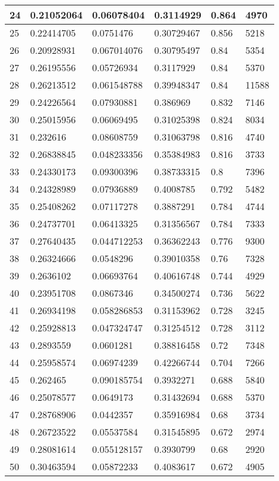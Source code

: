 \begin{longtable}{|l|l|l|l|l|l|}
24 & 0.21052064 & 0.06078404 & 0.3114929 & 0.864 & 4970 \\ \hline 
25 & 0.22414705 & 0.0751476 & 0.30729467 & 0.856 & 5218 \\ \hline 
26 & 0.20928931 & 0.067014076 & 0.30795497 & 0.84 & 5354 \\ \hline 
27 & 0.26195556 & 0.05726934 & 0.3117929 & 0.84 & 5370 \\ \hline 
28 & 0.26213512 & 0.061548788 & 0.39948347 & 0.84 & 11588 \\ \hline 
29 & 0.24226564 & 0.07930881 & 0.386969 & 0.832 & 7146 \\ \hline 
30 & 0.25015956 & 0.06069495 & 0.31025398 & 0.824 & 8034 \\ \hline 
31 & 0.232616 & 0.08608759 & 0.31063798 & 0.816 & 4740 \\ \hline 
32 & 0.26838845 & 0.048233356 & 0.35384983 & 0.816 & 3733 \\ \hline 
33 & 0.24330173 & 0.09300396 & 0.38733315 & 0.8 & 7396 \\ \hline 
34 & 0.24328989 & 0.07936889 & 0.4008785 & 0.792 & 5482 \\ \hline 
35 & 0.25408262 & 0.07117278 & 0.3887291 & 0.784 & 4744 \\ \hline 
36 & 0.24737701 & 0.06413325 & 0.31356567 & 0.784 & 7333 \\ \hline 
37 & 0.27640435 & 0.044712253 & 0.36362243 & 0.776 & 9300 \\ \hline 
38 & 0.26324666 & 0.0548296 & 0.39010358 & 0.76 & 7328 \\ \hline 
39 & 0.2636102 & 0.06693764 & 0.40616748 & 0.744 & 4929 \\ \hline 
40 & 0.23951708 & 0.0867346 & 0.34500274 & 0.736 & 5622 \\ \hline 
41 & 0.26934198 & 0.058286853 & 0.31153962 & 0.728 & 3245 \\ \hline 
42 & 0.25928813 & 0.047324747 & 0.31254512 & 0.728 & 3112 \\ \hline 
43 & 0.2893559 & 0.0601281 & 0.38816458 & 0.72 & 7348 \\ \hline 
44 & 0.25958574 & 0.06974239 & 0.42266744 & 0.704 & 7266 \\ \hline 
45 & 0.262465 & 0.090185754 & 0.3932271 & 0.688 & 5840 \\ \hline 
46 & 0.25078577 & 0.0649173 & 0.31432694 & 0.688 & 5370 \\ \hline 
47 & 0.28768906 & 0.0442357 & 0.35916984 & 0.68 & 3734 \\ \hline 
48 & 0.26723522 & 0.05537584 & 0.31545895 & 0.672 & 2974 \\ \hline 
49 & 0.28081614 & 0.055128157 & 0.3930799 & 0.68 & 2920 \\ \hline 
50 & 0.30463594 & 0.05872233 & 0.4083617 & 0.672 & 4905 \\ \hline 
\end{longtable}